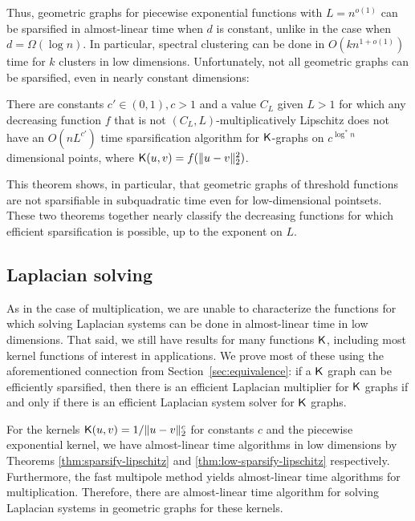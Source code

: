 Thus, geometric graphs for piecewise exponential functions with $L = n^{o(1)}$ can be sparsified in almost-linear time when $d$ is constant, unlike in the case when $d = \Omega(\log n)$. In particular, spectral clustering can be done in $O(kn^{1+o(1)})$ time for $k$ clusters in low dimensions. Unfortunately, not all geometric graphs can be sparsified, even in nearly constant dimensions:

\begin{theorem}\label{thm:informal-low-spars-hard}
There are constants $c'\in (0,1),c > 1$ and a value $C_L$ given $L > 1$ for which any decreasing function $f$ that is not $(C_L,L)$-multiplicatively Lipschitz does not have an $O(n L^{c'})$ time sparsification algorithm for $\mathsf{K}$-graphs on $c^{\log^*n}$ dimensional points, where $\mathsf{K}(u,v) = f(\|u-v\|_2^2)$.
\end{theorem}

This theorem shows, in particular, that geometric graphs of threshold functions are not sparsifiable in subquadratic time even for low-dimensional pointsets. These two theorems together nearly classify the decreasing functions for which efficient sparsification is possible, up to the exponent on $L$.

\subsection{Laplacian solving}

As in the case of multiplication, we are unable to characterize the functions for which solving Laplacian systems can be done in almost-linear time in low dimensions. That said, we still have results for many functions $\mathsf{K}$, including most kernel functions of interest in applications. We prove most of these using the aforementioned connection from Section~\ref{sec:equivalence}: if a $\mathsf{K}$ graph can be efficiently sparsified, then there is an efficient Laplacian multiplier for $\mathsf{K}$ graphs if and only if there is an efficient Laplacian system solver for $\mathsf{K}$ graphs.

For the kernels $\mathsf{K}(u,v) = 1/\|u-v\|_2^c$ for constants $c$ and the piecewise exponential kernel, we have almost-linear time algorithms in low dimensions by Theorems \ref{thm:sparsify-lipschitz} and \ref{thm:low-sparsify-lipschitz} respectively. Furthermore, the fast multipole method yields almost-linear time algorithms for multiplication. Therefore, there are almost-linear time algorithm for solving Laplacian systems in geometric graphs for these kernels.

